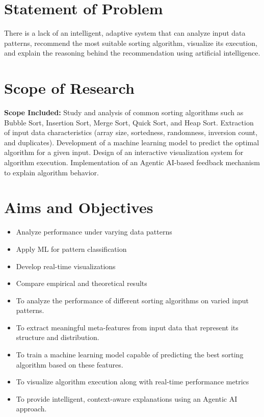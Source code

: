 \documentclass[12pt,a4paper,oneside,openany]{report}
\begin{document}
\section{Statement of Problem}
There is a lack of an intelligent, adaptive system that can analyze input data patterns, recommend the most suitable sorting algorithm, visualize its execution, and explain the reasoning behind the recommendation using artificial intelligence.
\section{Scope of Research}
\textbf{Scope Included:}
Study and analysis of common sorting algorithms such as Bubble Sort, Insertion Sort, Merge Sort, Quick Sort, and Heap Sort.
Extraction of input data characteristics (array size, sortedness, randomness, inversion count, and duplicates).
Development of a machine learning model to predict the optimal algorithm for a given input.
Design of an interactive visualization system for algorithm execution.
Implementation of an Agentic AI-based feedback mechanism to explain algorithm behavior.

\section{Aims and Objectives}
\begin{itemize}

\item Analyze performance under varying data patterns
\item Apply ML for pattern classification
\item Develop real-time visualizations
\item Compare empirical and theoretical results
\item To analyze the performance of different sorting algorithms on varied input patterns.
\item To extract meaningful meta-features from input data that represent its structure and distribution.
\item To train a machine learning model capable of predicting the best sorting algorithm based on these  features.
\item To visualize algorithm execution along with real-time performance metrics
\item To provide intelligent, context-aware explanations using an Agentic AI approach.
\end{itemize}
\end{document}
